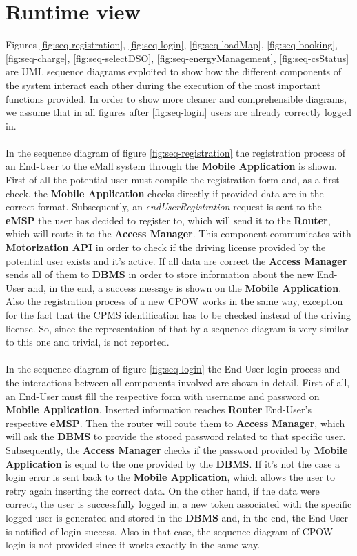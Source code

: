\documentclass[a4paper]{report}
\begin{document}
\section{Runtime view}

Figures \ref{fig:seq-registration}, \ref{fig:seq-login}, \ref{fig:seq-loadMap}, \ref{fig:seq-booking}, \ref{fig:seq-charge}, \ref{fig:seq-selectDSO}, \ref{fig:seq-energyManagement}, \ref{fig:seq-csStatus} are UML sequence diagrams exploited to show how the different components of the system interact each other during the execution of the most important functions provided. In order to show more cleaner and comprehensible diagrams, we assume that in all figures after \ref{fig:seq-login} users are already correctly logged in.
\\\\
In the sequence diagram of figure \ref{fig:seq-registration} the registration process of an End-User to the eMall system through the \textbf{Mobile Application} is shown. First of all the potential user must compile the registration form and, as a first check, the \textbf{Mobile Application} checks directly if provided data are in the correct format. Subsequently, an \textit{endUserRegistration} request is sent to the \textbf{eMSP} the user has decided to register to, which will send it to the \textbf{Router}, which will route it to the \textbf{Access Manager}. This component communicates with \textbf{Motorization API} in order to check if the driving license provided by the potential user exists and it's active. If all data are correct the \textbf{Access Manager} sends all of them to \textbf{DBMS} in order to store information about the new End-User and, in the end, a success message is shown on the \textbf{Mobile Application}. Also the registration process of a new CPOW works in the same way, exception for the fact that the CPMS identification has to be checked instead of the driving license. So, since the representation of that by a sequence diagram is very similar to this one and trivial, is not reported.
\\\\
In the sequence diagram of figure \ref{fig:seq-login} the End-User login process and the interactions between all components involved are shown in detail. First of all, an End-User must fill the respective form with username and password on \textbf{Mobile Application}. Inserted information reaches \textbf{Router} End-User's respective \textbf{eMSP}. Then the router will route them to \textbf{Access Manager}, which will ask the \textbf{DBMS} to provide the stored password related to that specific user. Subsequently, the \textbf{Access Manager} checks if the password provided by \textbf{Mobile Application} is equal to the one provided by the \textbf{DBMS}. If it's not the case a login error is sent back to the \textbf{Mobile Application}, which allows the user to retry again inserting the correct data. On the other hand, if the data were correct, the user is successfully logged in, a new token associated with the specific logged user is generated and stored in the \textbf{DBMS} and, in the end, the End-User is notified of login success. Also in that case, the sequence diagram of CPOW login is not provided since it works exactly in the same way.
\end{document}
